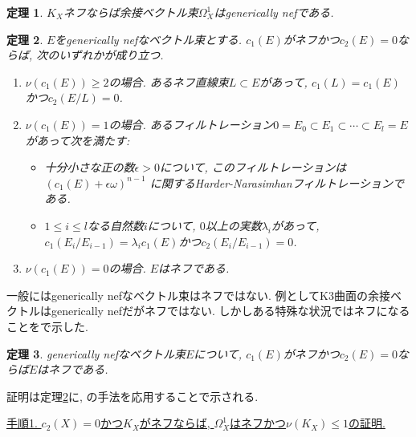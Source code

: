 \documentclass[12pt]{amsart}
\newtheorem{thm}{定理}[section]
\theoremstyle{definition}
\theoremstyle{remark}
\begin{document}
\begin{thm}\cite{Miy87a}\cite{CP11}\cite{CP19}\cite{Enoki88}\cite{Cao13}
\label{Semipositivity}
$K_X$ネフならば余接ベクトル束$\Omega_{X}^{1}$はgenerically nefである.
\end{thm}
\begin{thm}\cite{Miy87b}\cite{Ou17}\cite{Cao13}\cite{IM22}
\label{generically_nef}
$E$をgenerically nefなベクトル束とする. $c_1(E)$がネフかつ$c_2(E)=0$ならば, 次のいずれかが成り立つ.

 \begin{enumerate}
\renewcommand{\labelenumi}{(\arabic{enumi}).}
\renewcommand{\labelenumi}{$(\arabic{enumi})$.}
 \setlength{\parskip}{0cm} %
  \setlength{\itemsep}{0cm}
\item  $\nu(c_1(E))\ge 2$の場合. あるネフ直線束$L \subset E$があって, $c_1(L) = c_1(E)$かつ$c_2(E/L)=0$.
\item $\nu(c_1(E)) =1$の場合. あるフィルトレーション$0 =E_0 \subset E_1 \subset \cdots \subset E_l = E$があって次を満たす:
\begin{itemize}
 \setlength{\parskip}{0cm} %
  \setlength{\itemsep}{0cm}
\item 十分小さな正の数$\epsilon>0$について, このフィルトレーションは$(c_1(E) + \epsilon \omega)^{n-1}$ に関するHarder-Narasimhanフィルトレーションである.
\item $1 \le i \le l$なる自然数$i$について, $0$以上の実数$\lambda_i$があって, $c_1(E_i/ E_{i-1}) = \lambda_{i} c_1(E)$かつ$c_2(E_i/ E_{i-1})=0$.
\end{itemize}
\item $\nu(c_1(E)) =0$の場合. $E$はネフである.
 \end{enumerate}
\end{thm}

一般にはgenerically nefなベクトル束はネフではない. 例としてK3曲面の余接ベクトルはgenerically nefだがネフではない. しかしある特殊な状況ではネフになることを\cite{IM22}で示した.
\begin{thm}\cite{IM22}
\label{nefness}
generically nefなベクトル束$E$について, $c_1(E)$がネフかつ$c_2(E)=0$ならば$E$はネフである.
\end{thm}
証明は定理\ref{generically_nef}に\cite{Nak04}, \cite{Wu20}の手法を応用することで示される.
\vspace{11pt}

\hspace{-11pt}\underline{手順1. $c_2(X)= 0$かつ$K_X$がネフならば, $\Omega_{X}^{1}$はネフかつ$\nu(K_X) \le 1$の証明.}
\end{document}
